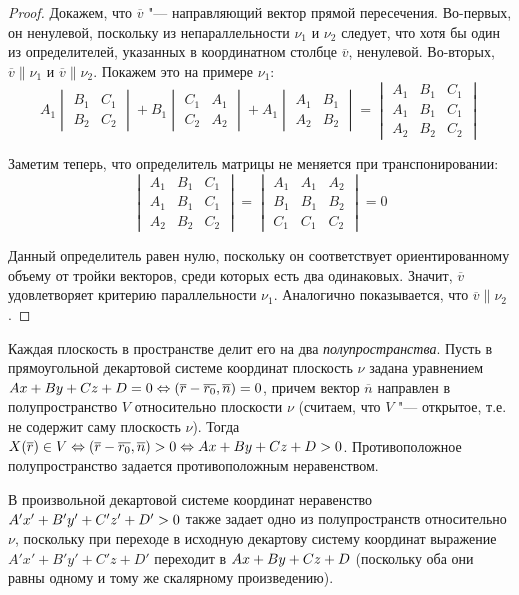 \begin{proof}
	Докажем, что $\overline{v}$ "--- направляющий вектор прямой пересечения. Во-первых, он ненулевой, поскольку из непараллельности $\nu_1$ и $\nu_2$ следует, что хотя бы один из определителей, указанных в координатном столбце $\overline{v}$, ненулевой. Во-вторых, $\overline{v} \parallel \nu_1$ и $\overline{v} \parallel \nu_2$. Покажем это на примере $\nu_1$:
	\[A_1\begin{vmatrix}B_1&C_1\\B_2&C_2\end{vmatrix}+
	B_1\begin{vmatrix}C_1&A_1\\C_2&A_2\end{vmatrix}+
	A_1\begin{vmatrix}A_1&B_1\\A_2&B_2\end{vmatrix} = 
	\begin{vmatrix}A_1&B_1&C_1\\A_1&B_1&C_1\\A_2&B_2&C_2\end{vmatrix}\]
	
	Заметим теперь, что определитель матрицы не меняется при транспонировании:
	\[\begin{vmatrix}A_1&B_1&C_1\\A_1&B_1&C_1\\A_2&B_2&C_2\end{vmatrix} = \begin{vmatrix}A_1&A_1&A_2\\B_1&B_1&B_2\\C_1&C_1&C_2\end{vmatrix} = 0\]
	
	Данный определитель равен нулю, поскольку он соответствует ориентированному объему от тройки векторов, среди которых есть два одинаковых. Значит, $\overline{v}$ удовлетворяет критерию параллельности $\nu_1$. Аналогично показывается, что $\overline{v} \parallel \nu_2$.
\end{proof}

\begin{note}
	Каждая плоскость в пространстве делит его на два \textit{полупространства}. Пусть в прямоугольной декартовой системе координат плоскость $\nu$ задана уравнением $Ax+By+Cz+D = 0 \Leftrightarrow (\overline{r} \hm{-} \overline{r_0}, \overline{n}) = 0$, причем вектор $\overline{n}$ направлен в полупространство $V$ относительно плоскости $\nu$ (считаем, что $V$ "--- открытое, т.\:е. не содержит саму плоскость $\nu$). Тогда $X(\overline{r}) \in V \Leftrightarrow (\overline{r} \hm{-} \overline{r_0}, \overline{n}) > 0 \hm{\Leftrightarrow} Ax+By+Cz+D > 0$. Противоположное полупространство задается противоположным неравенством.
	
	В произвольной декартовой системе координат неравенство $A'x'\hm{+}B'y'+C'z' +D' > 0$ также задает одно из полупространств относительно $\nu$, поскольку при переходе в исходную декартову систему координат выражение $A'x'+B'y'+C'z+D'$ переходит в $Ax\hm{+}By+Cz+D$ (поскольку оба они равны одному и тому же скалярному произведению).
\end{note}

